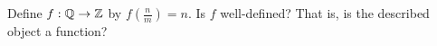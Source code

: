 \guard




\begin{exercise}
\label{exercise:nonWellDefinedFunction}
  Define $f:\mathbb{Q}\to\mathbb{Z}$ by $f(\frac{n}{m}) = n$.
  Is $f$ well-defined?
  That is, is the described object a function?
\end{exercise}
